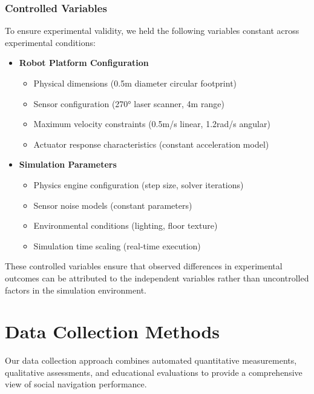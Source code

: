 
\subsubsection{Controlled Variables}
\label{subsubsec:controlled_variables}
To ensure experimental validity, we held the following variables constant 
across experimental conditions:
\begin{itemize}
    \item \textbf{Robot Platform Configuration}
    \begin{itemize}
        \item Physical dimensions (0.5m diameter circular footprint)
        \item Sensor configuration (270° laser scanner, 4m range)
        \item Maximum velocity constraints (0.5m/s linear, 1.2rad/s angular)
        \item Actuator response characteristics (constant acceleration model)
    \end{itemize}
    \item \textbf{Simulation Parameters}
    \begin{itemize}
        \item Physics engine configuration (step size, solver iterations)
        \item Sensor noise models (constant parameters)
        \item Environmental conditions (lighting, floor texture)
        \item Simulation time scaling (real-time execution)
    \end{itemize}
\end{itemize}
These controlled variables ensure that observed differences in experimental outcomes can be 
attributed to the independent variables rather than uncontrolled factors in the simulation 
environment.


\section{Data Collection Methods}
\label{sec:data_collection}
Our data collection approach combines automated quantitative measurements, qualitative 
assessments, and educational evaluations to provide a comprehensive view of social 
navigation performance.

